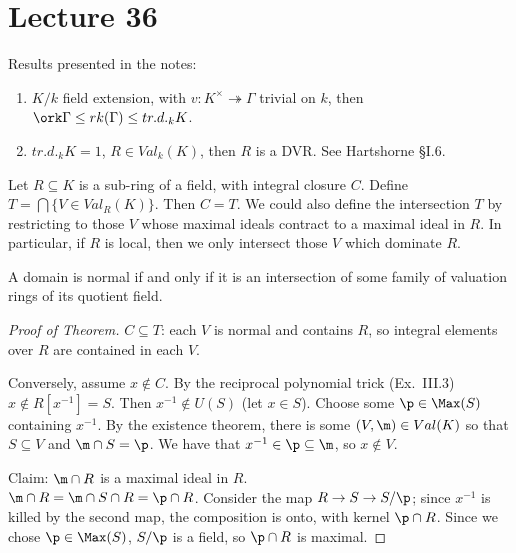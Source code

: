  \section{Lecture 36}

 Results presented in the notes:
 \begin{enumerate}
   \item $K/k$ field extension, with $v:K^\times\twoheadrightarrow \Gamma$ trivial on
   $k$, then $\ork \Gamma \le rk(\Gamma) \le tr.d._k K$.

   \item $tr.d._k K=1$, $R\in Val_k(K)$, then $R$ is a DVR. See Hartshorne \S I.6.
 \end{enumerate}

 \begin{theorem}
   Let $R\subseteq K$ is a sub-ring of a field, with integral closure $C$. Define
   $T=\bigcap \{V\in Val_R(K)\}$. Then $C=T$. We could also define the intersection $T$
   by restricting to those $V$ whose maximal ideals contract to a maximal ideal in $R$.
   In particular, if $R$ is local, then we only intersect those $V$ which dominate $R$.
 \end{theorem}
 \begin{corollary}
   A domain is normal if and only if it is an intersection of some family of valuation
   rings of its quotient field.
 \end{corollary}
 \begin{proof}[Proof of Theorem]
   $C\subseteq T$: each $V$ is normal and contains $R$, so integral elements over
   $R$ are contained in each $V$.

   Conversely, assume $x\not\in C$. By the reciprocal polynomial trick (Ex.~III.3)
   $x\not\in R[x^{-1}]=S$. Then $x^{-1}\notin U(S)$ (let $x\in S$). Choose some $\p\in
   \Max(S)$ containing $x^{-1}$. By the existence theorem, there is some $(V,\m)\in
   Val(K)$ so that $S\subseteq V$ and $\m\cap S=\p$. We have that $x^{-1}\in \p\subseteq
   \m$, so $x\not\in V$.

   Claim: $\m\cap R$ is a maximal ideal in $R$.\\
   $\m\cap R = \m\cap S\cap R = \p\cap R$. Consider the map $R\to S\to S/\p$; since
   $x^{-1}$ is killed by the second map, the composition is onto, with kernel $\p\cap R$.
   Since we chose $\p\in \Max (S)$, $S/\p$ is a field, so $\p\cap R$ is maximal.
 \end{proof}

